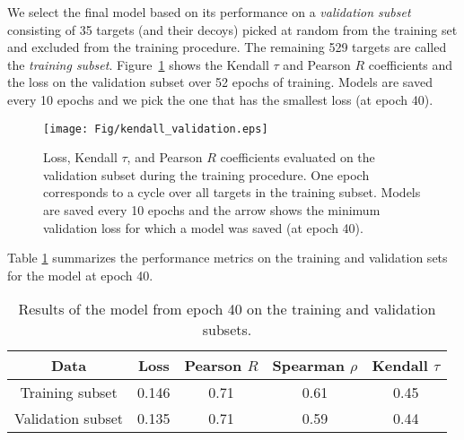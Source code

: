 We select the final model based on its performance on a
\emph{validation subset} consisting of 35 targets (and their decoys)
picked at random from the training set and excluded from the training
procedure. The remaining 529 targets are called the \emph{training
subset}.  Figure~\ref{Fig:TrainingLoss} shows the Kendall $\tau$ and
Pearson $R$ coefficients and the loss on the validation subset over 52
epochs of training.  Models are saved every 10 epochs and we pick the
one that has the smallest loss (at epoch 40).

\begin{figure}[H]
    \centering
    \texttt{[image: Fig/kendall\_validation.eps]}
%
    \caption{Loss, Kendall $\tau$, and Pearson $R$ coefficients
      evaluated on the validation subset during the training
      procedure.  One epoch corresponds to a cycle over all targets in
      the training subset. Models are saved every 10 epochs and the
      arrow shows the minimum validation loss for which a model was
      saved (at epoch 40).}
%
    \label{Fig:TrainingLoss}
\end{figure}

Table \ref{Tbl:TrainingResults} summarizes the performance metrics on
the training and validation sets for the model at epoch 40.

\begin{table}[H]
\begin{center}
\begin{tabular}{ c | c | c | c | c }
    Data & Loss & Pearson $R$ & Spearman $\rho$ & Kendall $\tau$ \\
    \hline
    Training subset     &0.146 &0.71 &0.61 &0.45 \\
    Validation subset   &0.135 &0.71 &0.59 &0.44 \\ \hline

\end{tabular}
  \caption {Results of the model from epoch 40 on the training and validation subsets.}
    \label{Tbl:TrainingResults}
\end{center}
\end{table}
